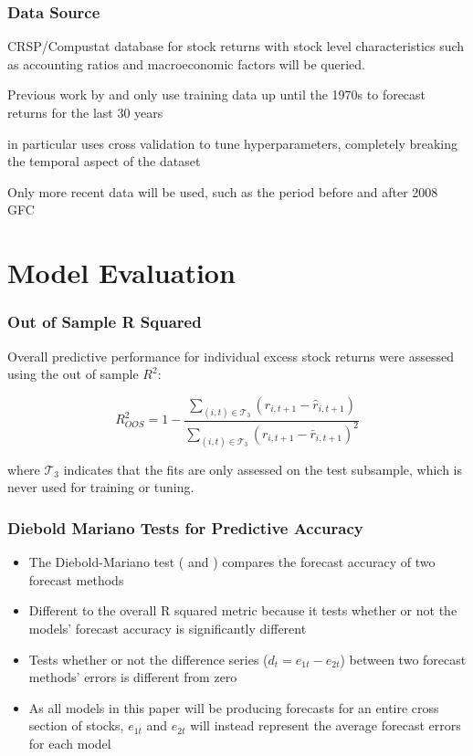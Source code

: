 \documentclass[]{beamer}
\begin{document}
\begin{frame}
\frametitle{Data Source}
CRSP/Compustat database for stock returns with stock level characteristics such as accounting ratios and macroeconomic factors will be queried.

Previous work by \cite{gu_empirical_2018} and \cite{feng_deep_2018} only use training data up until the 1970s to forecast returns for the last 30 years

\cite{feng_deep_2018} in particular uses cross validation to tune hyperparameters, completely breaking the temporal aspect of the dataset

Only more recent data will be used, such as the period before and after 2008 GFC
\end{frame}

\section{Model Evaluation}

\begin{frame}
\frametitle{Out of Sample R Squared}
Overall predictive performance for individual excess stock returns were assessed using the out of sample $R^2$:

\begin{equation}
R^2_{OOS} = 
	1 - 
	\frac{\sum_{(i, t)\in\mathcal{T}_3}(r_{i, t+1} - \widehat{r}_{i, t+1})}
	{\sum_{(i, t)\in\mathcal{T}_3} \left( r_{i, t+1} - \bar{r}_{i, t+1} \right) ^2}
\end{equation}

where $\mathcal{T}_3$ indicates that the fits are only assessed on the test subsample, which is never used for training or tuning. 
\end{frame}

\begin{frame}
\frametitle{Diebold Mariano Tests for Predictive Accuracy}
\begin{itemize}
	\item The Diebold-Mariano test (\cite{diebold_comparing_2002} and \cite{harvey_testing_1997}) compares the forecast accuracy of two forecast methods
	
	\item Different to the overall R squared metric because it tests whether or not the models' forecast accuracy is significantly different
	
	\item Tests whether or not the difference series ($d_t = e_{1t} - e_{2t}$) between two forecast methods' errors is different from zero
	
	\item As all models in this paper will be producing forecasts for an entire cross section of stocks, $e_{1t}$ and $e_{2t}$ will instead represent the average forecast errors for each model
\end{itemize}
\end{frame}
\end{document}
